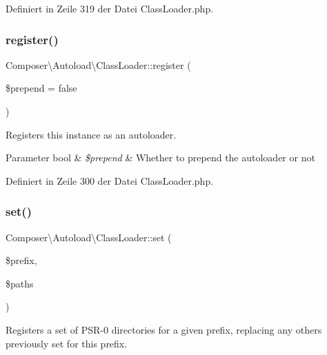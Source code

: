 Definiert in Zeile 319 der Datei Class\+Loader.\+php.

\mbox{\label{class_composer_1_1_autoload_1_1_class_loader_a478eedf860efe1bc1b2408fc28656111}} 
\subsubsection{\texorpdfstring{register()}{register()}}
{\footnotesize\ttfamily Composer\textbackslash{}\+Autoload\textbackslash{}\+Class\+Loader\+::register (\begin{DoxyParamCaption}\item[{}]{\$prepend = {\ttfamily false} }\end{DoxyParamCaption})}

Registers this instance as an autoloader.


\begin{DoxyParams}[1]{Parameter}
bool & {\em \$prepend} & Whether to prepend the autoloader or not \\
\hline
\end{DoxyParams}


Definiert in Zeile 300 der Datei Class\+Loader.\+php.

\mbox{\label{class_composer_1_1_autoload_1_1_class_loader_a76f8e2aa4329d78063cc7932108891ce}} 
\subsubsection{\texorpdfstring{set()}{set()}}
{\footnotesize\ttfamily Composer\textbackslash{}\+Autoload\textbackslash{}\+Class\+Loader\+::set (\begin{DoxyParamCaption}\item[{}]{\$prefix,  }\item[{}]{\$paths }\end{DoxyParamCaption})}

Registers a set of P\+S\+R-\/0 directories for a given prefix, replacing any others previously set for this prefix.


